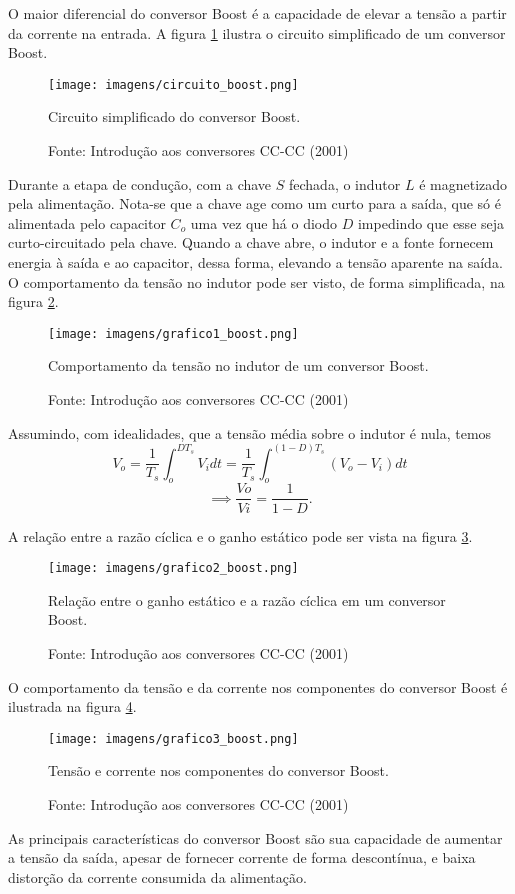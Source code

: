 O maior diferencial do conversor Boost é a capacidade de elevar a tensão a partir da corrente na entrada. A figura \ref{cboost} ilustra o circuito simplificado de um conversor Boost.

\begin{figure}[h]
\center
\texttt{[image: imagens/circuito\_boost.png]}
\caption{Circuito simplificado do conversor Boost.}\label{cboost} 
\caption*{Fonte: Introdução aos conversores CC-CC (2001)}
\end{figure}

Durante a etapa de condução, com a chave $S$ fechada, o indutor $L$ é magnetizado pela alimentação. Nota-se que a chave age como um curto para a saída, que só é alimentada pelo capacitor $C_o$ uma vez que há o diodo $D$ impedindo que esse seja curto-circuitado pela chave. Quando a chave abre, o indutor e a fonte fornecem energia à saída e ao capacitor, dessa forma, elevando a tensão aparente na saída. O comportamento da tensão no indutor pode ser visto, de forma simplificada, na figura \ref{g1bo}.

\begin{figure}[h]
\center
\texttt{[image: imagens/grafico1\_boost.png]}
\caption{Comportamento da tensão no indutor de um conversor Boost.}\label{g1bo} 
\caption*{Fonte: Introdução aos conversores CC-CC (2001)}
\end{figure}

Assumindo, com idealidades, que a tensão média sobre o indutor é nula, temos \[
V_o = \frac{1}{T_{s}}\int_{o}^{DT_{s}}V_{i}dt =  \frac{1}{T_{s}}\int_{o}^{(1-D)T_{s}}(V_{o} - V_{i})dt
\] \[
\implies \frac{V{o}}{V{i}} = \frac{1}{1-D}
.\]

A relação entre a razão cíclica e o ganho estático pode ser vista na figura \ref{g2bo}.

\begin{figure}[h]
\center
\texttt{[image: imagens/grafico2\_boost.png]}
\caption{Relação entre o ganho estático e a razão cíclica em um conversor Boost.}\label{g2bo} 
\caption*{Fonte: Introdução aos conversores CC-CC (2001)}
\end{figure}

O comportamento da tensão e da corrente nos componentes do conversor Boost é ilustrada na figura \ref{g3bo}.

\begin{figure}[h]
\center
\texttt{[image: imagens/grafico3\_boost.png]}
\caption{Tensão e corrente nos componentes do conversor Boost.}\label{g3bo} 
\caption*{Fonte: Introdução aos conversores CC-CC (2001)}
\end{figure}

As principais características do conversor Boost são sua capacidade de aumentar a tensão da saída, apesar de fornecer corrente de forma descontínua, e baixa distorção da corrente consumida da alimentação.

